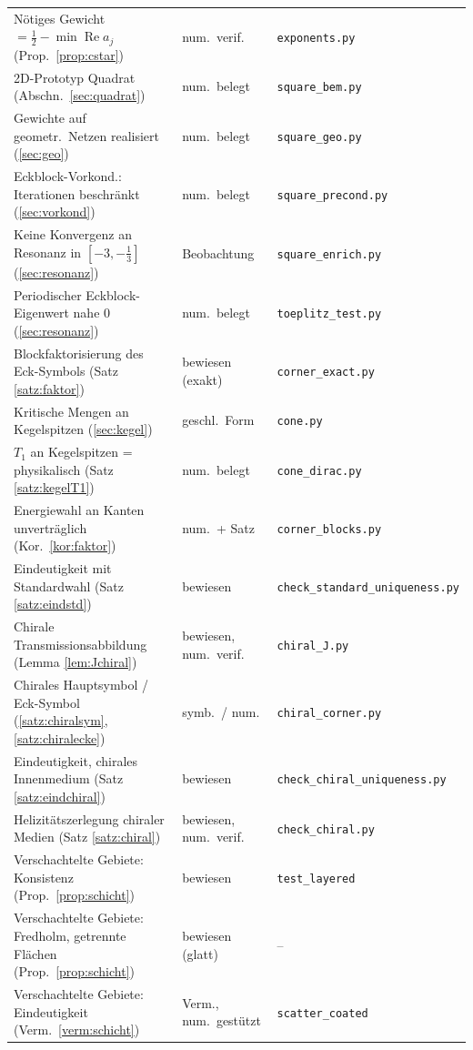 \documentclass[11pt, a4paper]{article}
\theoremstyle{plain}
\theoremstyle{definition}
\begin{document}
\begin{center}
\begin{tabular}{lll}
Nötiges Gewicht $=\tfrac12-\min\operatorname{Re}a_j$ (Prop.\ \ref{prop:cstar}) & num.\ verif. & \texttt{exponents.py}\\
2D-Prototyp Quadrat (Abschn.\ \ref{sec:quadrat}) & num.\ belegt & \texttt{square\_bem.py}\\
Gewichte auf geometr.\ Netzen realisiert (\ref{sec:geo}) & num.\ belegt & \texttt{square\_geo.py}\\
Eckblock-Vorkond.: Iterationen beschränkt (\ref{sec:vorkond}) & num.\ belegt & \texttt{square\_precond.py}\\
Keine Konvergenz an Resonanz in $[-3,-\tfrac13]$ (\ref{sec:resonanz}) & Beobachtung & \texttt{square\_enrich.py}\\
Periodischer Eckblock-Eigenwert nahe 0 (\ref{sec:resonanz}) & num.\ belegt & \texttt{toeplitz\_test.py}\\
Blockfaktorisierung des Eck-Symbols (Satz \ref{satz:faktor}) & bewiesen (exakt) & \texttt{corner\_exact.py}\\
Kritische Mengen an Kegelspitzen (\ref{sec:kegel}) & geschl.\ Form & \texttt{cone.py}\\
$T_1$ an Kegelspitzen = physikalisch (Satz \ref{satz:kegelT1}) & num.\ belegt & \texttt{cone\_dirac.py}\\
Energiewahl an Kanten unverträglich (Kor.\ \ref{kor:faktor}) & num.\ + Satz & \texttt{corner\_blocks.py}\\
Eindeutigkeit mit Standardwahl (Satz \ref{satz:eindstd}) & bewiesen & \texttt{check\_standard\_uniqueness.py}\\
Chirale Transmissionsabbildung (Lemma \ref{lem:Jchiral}) & bewiesen, num.\ verif. & \texttt{chiral\_J.py}\\
Chirales Hauptsymbol / Eck-Symbol (\ref{satz:chiralsym}, \ref{satz:chiralecke}) & symb.\ / num. & \texttt{chiral\_corner.py}\\
Eindeutigkeit, chirales Innenmedium (Satz \ref{satz:eindchiral}) & bewiesen & \texttt{check\_chiral\_uniqueness.py}\\
Helizitätszerlegung chiraler Medien (Satz \ref{satz:chiral}) & bewiesen, num.\ verif. & \texttt{check\_chiral.py}\\
Verschachtelte Gebiete: Konsistenz (Prop.\ \ref{prop:schicht}) & bewiesen & \texttt{test\_layered}\\
Verschachtelte Gebiete: Fredholm, getrennte Flächen (Prop.\ \ref{prop:schicht}) & bewiesen (glatt) & --\\
Verschachtelte Gebiete: Eindeutigkeit (Verm.\ \ref{verm:schicht}) & Verm., num.\ gestützt & \texttt{scatter\_coated}\\

\end{tabular}
\end{center}
\end{document}
